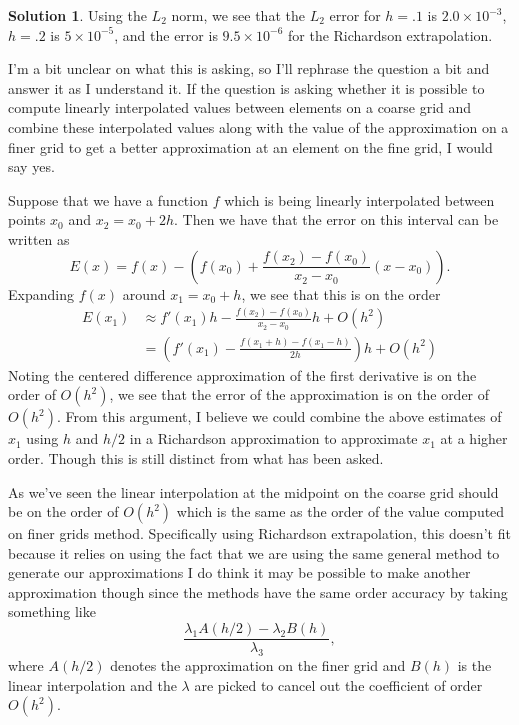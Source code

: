 \documentclass[12pt]{article}
\theoremstyle{definition}
\newtheorem{sol}{Solution}
\theoremstyle{remark}
\begin{document}
\begin{sol}
Using the $L_{2}$ norm, we see that the $L_{2}$ error for $h = .1$ is $ 2.0 \times 10^{-3}$, $h = .2$ is $5 \times 10^{-5}$, and the error is $9.5 \times 10^{-6}$ for the Richardson extrapolation.


I'm a bit unclear on what this is asking, so I'll rephrase the question a bit and answer it as I understand it. If the question is asking whether it is possible to compute linearly interpolated  values between elements on a coarse grid and combine these interpolated values along with the value of the approximation on a finer grid to get a better approximation at an element on the fine grid, I would say yes. 


Suppose that we have a function $f$ which is being linearly interpolated between points $x_{0}$ and $x_{2} = x_{0} + 2h$. Then we have that the error on this interval can be written as
\begin{equation*}
    E(x) = f(x) - \left(  f(x_{0}) + \frac{f(x_{2}) - f(x_{0})}{x_{2} - x_{0}} (x - x_{0})\right).
\end{equation*}
Expanding $f(x)$ around $x_{1} = x_{0} + h$, we see that this is on the order
\begin{align*}
    E(x_{1}) &\approx f'(x_{1}) h - \frac{f(x_{2}) - f(x_{0})}{x_{2} - x_{0}}h + O(h^{2})\\
             &= \left( f'(x_{1}) - \frac{f(x_{1} + h) - f(x_{1} - h)}{2h} \right) h + O(h^{2})
\end{align*}
Noting the centered difference approximation of the first derivative is on the order of $O(h^{2})$, we see that the error of the approximation is on the order of $O(h^{2})$. From this argument, I believe we could combine the above estimates of $x_{1}$ using $h$ and $h / 2$ in a Richardson approximation to approximate $x_{1}$ at a higher order. Though this is still  distinct from what has been asked.


As we've seen the linear interpolation at the midpoint on the coarse grid should be on the order of $O(h^{2})$ which is the same as the order of the value computed on finer grids method. Specifically using Richardson extrapolation, this doesn't fit because it relies on using the fact that we are using the same general method to generate our approximations I do think it may be possible to make another approximation though since the methods have the same order accuracy by taking something like
\begin{equation*}
    \frac{\lambda_{1} A(h / 2) - \lambda_{2} B(h)}{\lambda_{3}},
\end{equation*}
where $A( h / 2 )$ denotes the approximation on the finer grid and $B(h)$ is the linear interpolation and the $\lambda$ are picked to cancel out the coefficient of order $O(h^{2})$.
\end{sol}
\end{document}
